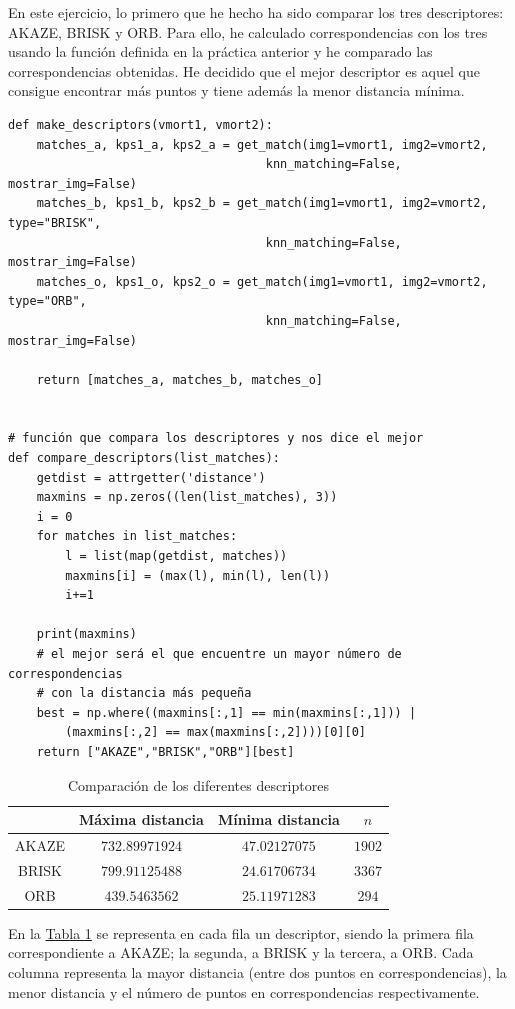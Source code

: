 \documentclass[11pt,a4paper]{article}
\theoremstyle{plain}
\theoremstyle{definition}
\begin{document}
En este ejercicio, lo primero que he hecho ha sido comparar los tres descriptores: AKAZE, BRISK y ORB. Para ello, he calculado correspondencias con los tres usando la función definida en la práctica anterior y he comparado las correspondencias obtenidas. He decidido que el mejor descriptor es aquel que consigue encontrar más puntos y tiene además la menor distancia mínima.

\begin{verbatim}
def make_descriptors(vmort1, vmort2):
    matches_a, kps1_a, kps2_a = get_match(img1=vmort1, img2=vmort2, 
                                    knn_matching=False, mostrar_img=False)
    matches_b, kps1_b, kps2_b = get_match(img1=vmort1, img2=vmort2, type="BRISK", 
                                    knn_matching=False, mostrar_img=False)
    matches_o, kps1_o, kps2_o = get_match(img1=vmort1, img2=vmort2, type="ORB", 
                                    knn_matching=False, mostrar_img=False)

    return [matches_a, matches_b, matches_o]


# función que compara los descriptores y nos dice el mejor
def compare_descriptors(list_matches):
    getdist = attrgetter('distance')
    maxmins = np.zeros((len(list_matches), 3))
    i = 0
    for matches in list_matches:
        l = list(map(getdist, matches))
        maxmins[i] = (max(l), min(l), len(l))
        i+=1

    print(maxmins)
    # el mejor será el que encuentre un mayor número de correspondencias 
    # con la distancia más pequeña
    best = np.where((maxmins[:,1] == min(maxmins[:,1])) | 
        (maxmins[:,2] == max(maxmins[:,2])))[0][0]
    return ["AKAZE","BRISK","ORB"][best]
\end{verbatim}

\begin{table}[!h]
\centering
\begin{tabular}{cccc}
& Máxima distancia & Mínima distancia & $n$ \\
\hline
AKAZE & $732.89971924$  &  $47.02127075$ & $1902$ \\
BRISK & $799.91125488$  &  $24.61706734$ & $3367$ \\
ORB & $439.5463562$  &   $25.11971283$ &  $294$
\end{tabular}
\caption{Comparación de los diferentes descriptores}
\label{compdesc}
\end{table}

En la \hyperref[compdesc]{Tabla \ref*{compdesc}} se representa en cada fila un descriptor, siendo la primera fila correspondiente a AKAZE; la segunda, a BRISK y la tercera, a ORB. Cada columna representa la mayor distancia (entre dos puntos en correspondencias), la menor distancia y el número de puntos en correspondencias respectivamente.
\end{document}
